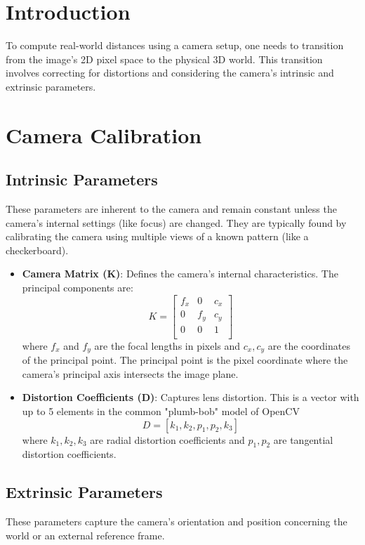 \section{Introduction}
To compute real-world distances using a camera setup, one needs to transition from the image's 2D pixel space to the physical 3D world. This transition involves correcting for distortions and considering the camera's intrinsic and extrinsic parameters.

\section{Camera Calibration}

\subsection{Intrinsic Parameters}
These parameters are inherent to the camera and remain constant unless the camera's internal settings (like focus) are changed. They are typically found by calibrating the camera using multiple views of a known pattern (like a checkerboard).

\begin{itemize}
    \item \textbf{Camera Matrix (K)}: Defines the camera's internal characteristics. The principal components are:
          \[
              K = \begin{bmatrix}
                  f_x & 0   & c_x \\
                  0   & f_y & c_y \\
                  0   & 0   & 1   \\
              \end{bmatrix}
          \]
          where \(f_x\) and \(f_y\) are the focal lengths in pixels and \(c_x, c_y\) are the coordinates of the principal point. The principal point is the pixel coordinate where the camera's principal axis intersects the image plane.

    \item \textbf{Distortion Coefficients (D)}: Captures lens distortion. This is a vector with up to 5 elements in the common "plumb-bob" model of OpenCV
          \[
              D = [k_1, k_2, p_1, p_2, k_3]
          \]
          where \(k_1, k_2, k_3\) are radial distortion coefficients and \(p_1, p_2\) are tangential distortion coefficients.
\end{itemize}

\subsection{Extrinsic Parameters}
These parameters capture the camera's orientation and position concerning the world or an external reference frame.

